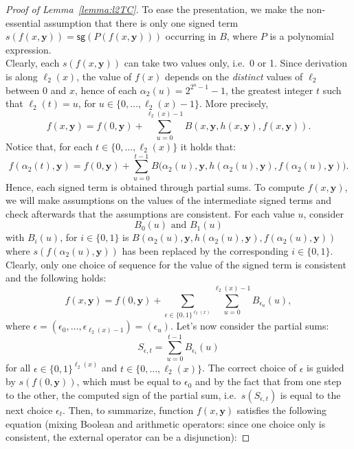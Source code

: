 \documentclass[11pt, oneside]{article}
\newenvironment{toappendix}{}{}
\newcommand{\fun}[1]{\mathsf{#1}}
\newcommand{\tu}[1]{\mathbf{#1}}
\theoremstyle{definition}
\begin{document}
\begin{toappendix}
    \begin{proof}[Proof of Lemma~\ref{lemma:l2TC}]
        To ease the presentation, we make the non-essential assumption that there is only one signed term $s(f(x, \tu y))=\fun{sg}(P(f(x, \tu y)))$ occurring in $B$, where $P$ is a polynomial expression.
        \\
        Clearly, each $s(f(x, \tu y))$ can take two values only, i.e.~0 or 1.
        Since derivation is along $\ell_2(x)$, the value of $f(x)$ depends on the \emph{distinct} values of $\ell_2$ between 0 and $x$, hence of each $\alpha_2(u)=2^{2^u-1}-1$, the greatest integer $t$ such that $\ell_2(t)=u$, for $u\in \{0,\dots, \ell_2(x)-1\}$.
        More precisely, 
        $$
            f(x, \tu y) = f(0, \tu y) + \sum^{\ell_2(x)-1}_{u=0} B(x, \tu y, h(x, \tu y), f(x, \tu y)).
        $$
        Notice that, for each $t\in \{0,\dots, \ell_2(x)\}$ it holds that:
        $$
             f(\alpha_2(t), \tu y) = f(0, \tu y) + \sum^{t-1}_{u=0} B\big(\alpha_2(u), \tu y, h(\alpha_2(u), \tu y), f(\alpha_2(u), \tu y)\big).
        $$
        Hence, each signed term is obtained through partial sums.
        To compute $f(x, \tu y)$, we will make assumptions on the values of the intermediate signed terms and check afterwards that the assumptions are consistent.
        For each value $u$, consider
        $$
            B_0(u) \text{ and } B_1(u)
        $$
        with $B_i(u)$, for $i\in \{0,1\}$ is $B(\alpha_2(u), \tu y, h(\alpha_2(u), \tu y), f(\alpha_2(u), \tu y))$ where $s(f(\alpha_2(u), \tu y))$ has been replaced by the corresponding $i\in \{0, 1\}$.
        \\
        Clearly, only one choice of sequence for the value of the signed term is consistent and the following holds:
        $$
        f(x, \tu y) = f(0, \tu y) + \sum_{\epsilon \in \{0,1\}^{\ell_2(x)}} \sum^{\ell_2(x)-1}_{u=0} B_{\epsilon_u}(u),
        $$
        where $\epsilon = (\epsilon_0, \dots, \epsilon_{\ell_2(x)-1})=(\epsilon_u)$.
        Let's now consider the partial sums:
        $$
        S_{\epsilon, t} = \sum^{t-1}_{u=0} B_{\epsilon_i}(u)
        $$
        for all $\epsilon \in \{0,1\}^{\ell_2(x)}$ and $t\in \{0,\dots, \ell_2(x)\}$.
        The correct choice of $\epsilon$ is guided by $s(f(0, \tu y))$, which must be equal to $\epsilon_0$ and by the fact that from one step to the other, the computed sign of the partial sum, i.e.~$s(S_{\epsilon,t})$ is equal to the next choice $\epsilon_t$.
        Then, to summarize, function $f(x, \tu y)$ satisfies the following equation (mixing Boolean and arithmetic operators: since one choice only is consistent, the external operator can be a disjunction):

\end{proof}
\end{toappendix}
\end{document}
